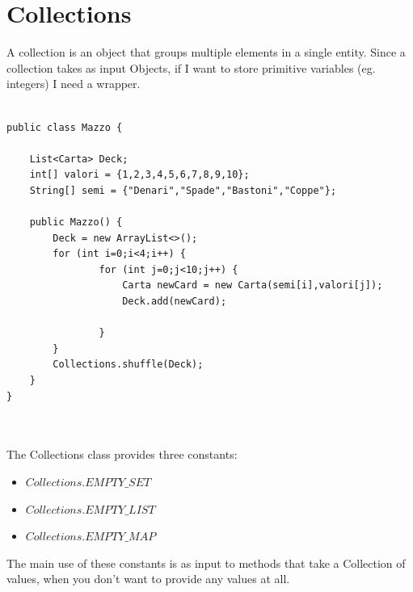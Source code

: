 \documentclass[10pt,a4paper]{book}
\begin{document}
\section{Collections}
A collection is an object that groups multiple elements in a single entity. Since a collection takes as input Objects, if I want to store primitive variables (eg. integers) I need a wrapper. 
\\\\
\begin{verbatim}
public class Mazzo {
    
    List<Carta> Deck;
    int[] valori = {1,2,3,4,5,6,7,8,9,10};
    String[] semi = {"Denari","Spade","Bastoni","Coppe"};
    
    public Mazzo() {
        Deck = new ArrayList<>();
        for (int i=0;i<4;i++) {
                for (int j=0;j<10;j++) {
                    Carta newCard = new Carta(semi[i],valori[j]);
                    Deck.add(newCard);
                    
                }
        }
        Collections.shuffle(Deck);
    }
}

\end{verbatim}
\\\\
The Collections class provides three constants:
\begin{itemize}
\item $Collections.EMPTY\_SET $
\item $Collections.EMPTY\_LIST $
\item $Collections.EMPTY\_MAP $
\end{itemize}
The main use of these constants is as input to methods that take a Collection of values, when you 
don't want to provide any values at all. 

\newpage
\end{document}
